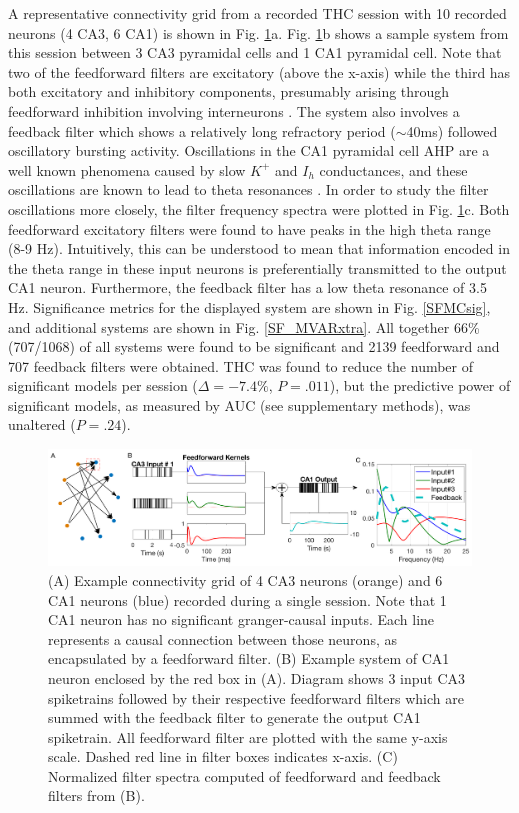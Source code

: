 \documentclass[11pt,a4paper,final]{article}
\begin{document}
A representative connectivity grid from a recorded THC session with 10 recorded neurons (4 CA3, 6 CA1) is shown in Fig. \ref{ex}a.
Fig. \ref{ex}b shows a sample system from this session between 3 CA3 pyramidal cells and 1 CA1 pyramidal cell.
Note that two of the feedforward filters are excitatory (above the x-axis) while the third has both excitatory and inhibitory components, presumably arising through feedforward inhibition involving interneurons \citep{pouille01,zemankovics13}.
The system also involves a feedback filter which shows a relatively long refractory period ($\sim$40ms) followed oscillatory bursting activity.
Oscillations in the CA1 pyramidal cell AHP are a well known phenomena caused by slow $K^+$ and $I_h$ conductances, and these oscillations are known to lead to theta resonances \citep{leung98,yarom00,sandler14}.
In order to study the filter oscillations more closely, the filter frequency spectra were plotted in Fig. \ref{ex}c.
Both feedforward excitatory filters were found to have peaks in the high theta range (8-9 Hz).
Intuitively, this can be understood to mean that information encoded in the theta range in these input neurons is preferentially transmitted to the output CA1 neuron.
Furthermore, the feedback filter has a low theta resonance of 3.5 Hz.
Significance metrics for the displayed system are shown in Fig. \ref{SFMCsig}, and additional systems are shown in Fig. \ref{SF_MVARxtra}.
All together 66\% (707/1068) of all systems were found to be significant and 2139 feedforward and 707 feedback filters were obtained.
THC was found to reduce the number of significant models per session ($\Delta=-7.4\%$, $P=.011$), but the predictive power of significant models, as measured by AUC (see supplementary methods), was unaltered ($P=.24$).

\begin{figure}[!ht]
\centering
\includegraphics[width=160mm]{ex_tmp}
\caption[Example System]{
(A) Example connectivity grid of 4 CA3 neurons (orange) and 6 CA1 neurons (blue) recorded during a single session. Note that 1 CA1 neuron has no significant granger-causal inputs. Each line represents a causal connection between those neurons, as encapsulated by a feedforward filter.
(B) Example system of CA1 neuron enclosed by the red box in (A). Diagram shows 3 input CA3 spiketrains followed by their respective feedforward filters which are summed with the feedback filter to generate the output CA1 spiketrain. All feedforward filter are plotted with the same y-axis scale. Dashed red line in filter boxes indicates x-axis.
(C) Normalized filter spectra computed of feedforward and feedback filters from (B).}
\label{ex}
\end{figure}
\end{document}
